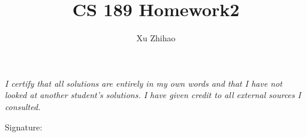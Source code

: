 \documentclass[a4paper,12pt]{article}
\title{CS 189 Homework2}
\author{Xu Zhihao}
\begin{document}
\pagestyle{fancy}{}
\fancyhf{} 
\rhead{\thepage \  / \pageref{LastPage}}

\maketitle

\emph{I certify that all solutions are entirely in my own words and that I have not looked at another student’s solutions. I have given credit to all external sources I consulted.} 
\begin{flushright}
Signature: \quad \quad \quad \quad \quad \quad \quad \quad \quad \quad \quad
\end{flushright}
\vspace{100pt}


\clearpage
\end{document}
